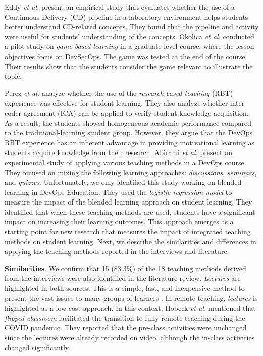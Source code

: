 \documentclass[10pt,conference]{IEEEtran}
\begin{document}
Eddy \textit{et al.} \cite{eddy:2017_pp} present an empirical study that evaluates whether the use of a Continuous Delivery (CD) pipeline in a laboratory environment helps students better understand CD-related concepts. They found that the pipeline and activity were useful for students' understanding of the concepts. Okolica \textit{et al.} \cite{okolica:2020_pp} conducted a pilot study on \textsl{game-based learning} in a graduate-level course, where the lesson objectives focus on DevSecOps. The game was tested at the end of the course. Their results show that the students consider the game relevant to illustrate the topic.  

Perez \textit{et al.} \cite{perez:2021_pp} analyze whether the use of the \textsl{research-based teaching} (RBT) experience was effective for student learning. They also analyze whether inter-coder agreement (ICA) can be applied to verify student knowledge acquisition. As a result, the students showed homogeneous academic performance compared to the traditional-learning student group. However, they argue that the DevOps RBT experience has an inherent advantage in providing motivational learning as students acquire knowledge from their research. Abirami \textit{et al.} \cite{abirami:2021_pp} present an experimental study of applying various teaching methods in a DevOps course. They focused on mixing the following learning approaches: \textsl{discussions}, \textsl{seminars}, and \textsl{quizzes}. Unfortunately, we only identified this study working on blended learning in DevOps Education. They used the \textit{logistic regression model} to measure the impact of the blended learning approach on student learning. They identified that when these teaching methods are used, students have a significant impact on increasing their learning outcomes. This approach emerges as a starting point for new research that measures the impact of integrated teaching methods on student learning. Next, we describe the similarities and differences in applying the teaching methods reported in the interviews and literature.

\textbf{Similarities}. We confirm that 15 (83.3\%) of the 18 teaching methods derived from the interviews were also identified in the literature review. \textsl{Lectures} are highlighted in both sources. This is a simple, fast, and inexpensive method to present the vast issues to many groups of learners \cite{sadeghi:2014, golafrooz:2010}. In remote teaching, \textsl{lectures} is highlighted as a low-cost approach. In this context, Hobeck \textit{et al.} \cite{hobeck:2021_pp} mentioned that \textsl{flipped classroom} facilitated the transition to fully remote teaching during the COVID pandemic. They reported that the pre-class activities were unchanged since the lectures were already recorded on video, although the in-class activities changed significantly.
\end{document}
